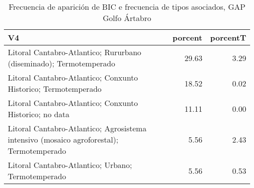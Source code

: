 \begin{table}[p]
\centering
\caption{Frecuencia de aparición de BIC e frecuencia de tipos asociados, GAP Golfo Ártabro} 
\label{vbic1}
\begin{tabular}{lrr}
  \hline
V4 & porcent & porcentT \\ 
  \hline
Litoral Cantabro-Atlantico; Rururbano (diseminado); Termotemperado & 29.63 & 3.29 \\ 
  Litoral Cantabro-Atlantico; Conxunto Historico; Termotemperado & 18.52 & 0.02 \\ 
  Litoral Cantabro-Atlantico; Conxunto Historico; no data & 11.11 & 0.00 \\ 
  Litoral Cantabro-Atlantico; Agrosistema intensivo (mosaico agroforestal); Termotemperado & 5.56 & 2.43 \\ 
  Litoral Cantabro-Atlantico; Urbano; Termotemperado & 5.56 & 0.53 \\ 
   \hline
\end{tabular}
\end{table}

